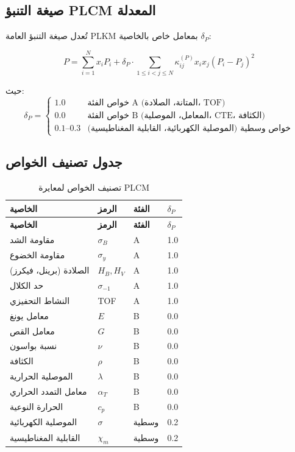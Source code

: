 \documentclass[11pt,a4paper]{article}
\begin{document}
\begin{otherlanguage}{arabic}
		\subsection{صيغة التنبؤ PLCM المعدلة}
		
		تُعدل صيغة التنبؤ العامة PLKM بمعامل خاص بالخاصية \(\delta_P\):
		
		\begin{equation}
			\boxed{P = \sum_{i=1}^{N} x_i P_i + \delta_P \cdot \sum_{1\le i<j\le N} \kappa_{ij}^{(P)} x_i x_j (P_i - P_j)^2}
			\label{eq:plcm-modified}
		\end{equation}
		
		حيث:
		\[
		\delta_P = \begin{cases}
			1.0 & \text{خواص الفئة A (المتانة، الصلادة، TOF)} \\
			0.0 & \text{خواص الفئة B (المعامل، الموصلية، CTE، الكثافة)} \\
			0.1\text{--}0.3 & \text{خواص وسطية (الموصلية الكهربائية، القابلية المغناطيسية)}
		\end{cases}
		\]
		
		\subsection{جدول تصنيف الخواص}
		
		\begin{longtable}{p{4cm}p{3cm}p{3cm}p{3cm}}
			\caption{تصنيف الخواص لمعايرة PLCM} \label{tab:property-classification} \\
			\toprule
			\textbf{الخاصية} & \textbf{الرمز} & \textbf{الفئة} & \(\delta_P\) \\
			\midrule
			\endfirsthead
			\toprule
			\textbf{الخاصية} & \textbf{الرمز} & \textbf{الفئة} & \(\delta_P\) \\
			\midrule
			\endhead
			مقاومة الشد & \(\sigma_B\) & A & 1.0 \\
			مقاومة الخضوع & \(\sigma_y\) & A & 1.0 \\
			الصلادة (برينل، فيكرز) & \(H_B, H_V\) & A & 1.0 \\
			حد الكلال & \(\sigma_{-1}\) & A & 1.0 \\
			النشاط التحفيزي & TOF & A & 1.0 \\
			\hline
			معامل يونغ & \(E\) & B & 0.0 \\
			معامل القص & \(G\) & B & 0.0 \\
			نسبة بواسون & \(\nu\) & B & 0.0 \\
			الكثافة & \(\rho\) & B & 0.0 \\
			الموصلية الحرارية & \(\lambda\) & B & 0.0 \\
			معامل التمدد الحراري & \(\alpha_T\) & B & 0.0 \\
			الحرارة النوعية & \(c_p\) & B & 0.0 \\
			\hline
			الموصلية الكهربائية & \(\sigma\) & وسطية & 0.2 \\
			القابلية المغناطيسية & \(\chi_m\) & وسطية & 0.2 \\
			\bottomrule
		\end{longtable}
		

\end{otherlanguage}
\end{document}
